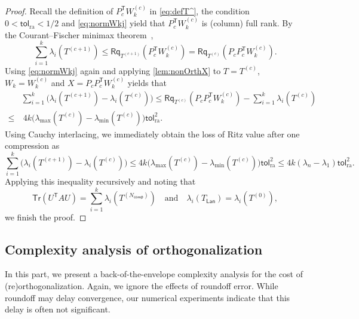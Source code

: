 \documentclass{siamart190516}
\newcommand{\Ttran}{\mathsf{T}}
\newcommand{\tol}{\mathsf{tol}}
\newcommand{\Tr}{\mathsf{Tr}}
\newcommand{\Rq}{\mathsf{Rq}}
\newcommand{\lan}{\mathsf{Lan}}
\newcommand{\compress}{N_\mathsf{comp}}
\begin{document}
\begin{proof}
    Recall the definition of $P_{c}^{\Ttran}W_{k}^{(c)}$ in \cref{eq:defT^}, the condition $0< \tol_{\mathrm{ra}}< 1/2$ and \cref{eq:normWkj} yield that $P_{c}^{\Ttran}W_{k}^{(c)}$ is (column) full rank.
    By the Courant--Fischer minimax theorem~\cite[Thm.~8.1.2]{Golub2013}, 
    \begin{equation*}
        \sum_{i=1}^{k}\lambda_{i}(T^{(c+1)}) \leq \Rq_{T^{(c+1)}}(P_{c}^{\Ttran}W_{k}^{(c)}) = \Rq_{T^{(c)}}(P_{c}P_{c}^{\Ttran}W_{k}^{(c)}).
    \end{equation*}
    Using \cref{eq:normWkj} again and applying \cref{lem:nonOrthX} to $T=T^{(c)}$, $W_{k}=W_{k}^{(c)}$ and $X=P_{c}P_{c}^{\Ttran}W_{k}^{(c)}$ yields that 
    \begin{equation*}
        \begin{aligned}
            &\sum_{i=1}^{k}\bigl(\lambda_{i}(T^{(c+1)})-\lambda_{i}(T^{(c)})\bigr) \leq \Rq_{T^{(c)}}(P_{c}P_{c}^{\Ttran}W_{k}^{(c)})-\sum_{i=1}^{k}\lambda_{i}(T^{(c)})\\  
        \leq&\  4k\bigl(\lambda_{\max}(T^{(c)})-\lambda_{\min}(T^{(c)})\bigr)\tol_{\mathrm{ra}}^{2}.        
        \end{aligned}
    \end{equation*}
    Using Cauchy interlacing, we immediately obtain the loss of Ritz value after one compression as 
    \begin{equation*}
        \sum_{i=1}^{k}\bigl(\lambda_{i}(T^{(c+1)})-\lambda_{i}(T^{(c)})\bigr) \leq
        4k\bigl(\lambda_{\max}(T^{(c)})-\lambda_{\min}(T^{(c)})\bigr)\tol_{\mathrm{ra}}^{2}\leq 4k(\lambda_{n}-\lambda_{1})\tol_{\mathrm{ra}}^{2}.
    \end{equation*}
    Applying this inequality recursively and noting that 
    \begin{equation*}
        \Tr(U^{\Ttran}AU) = \sum_{i=1}^{k}\lambda_{i}(T^{(\compress)})\quad \text{and}\quad \lambda_{i}(T_{\lan}) = \lambda_{i}(T^{(0)}),
    \end{equation*}
    we finish the proof.
\end{proof}


\subsection{Complexity analysis of orthogonalization}

In this part, we present a back-of-the-envelope complexity analysis for the cost of (re)orthogonalization. Again, we ignore the effects of roundoff error. While roundoff may delay convergence, our numerical experiments indicate that this delay is often not significant.
\end{document}
